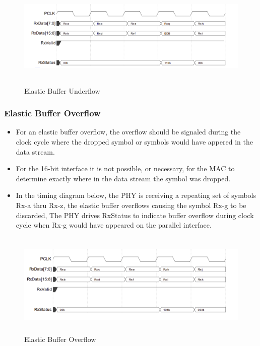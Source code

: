\begin{figure}[H]
  \centering
  \includegraphics[width=130mm,height=50mm]{images/clk_diagram/underflow.png}
  \caption{Elastic Buffer Underflow}
  \label{lane}
\end{figure}
\subsubsection{Elastic Buffer Overflow}
\begin{itemize}
    \item For an elastic buffer overflow, the overflow should be signaled during the clock cycle where the dropped symbol or symbols would have appered in the data stream.

    \item For the 16-bit interface it is not possible, or necessary, for the MAC to determine exactly where in the data stream the symbol was dropped.

    \item In the timing diagram below, the PHY is receiving a repeating set of symbols Rx-a thru Rx-z, the elastic buffer overflows causing the symbol Rx-g to be discarded, The PHY drives RxStatus to indicate buffer overflow during clock cycle when Rx-g would have appeared on the parallel interface.     

\end{itemize}




\begin{figure}[H]
  \centering
  \includegraphics[width=130mm,height=50mm]{images/clk_diagram/overflow.png}
  \caption{Elastic Buffer Overflow}
  \label{lane}
\end{figure}
